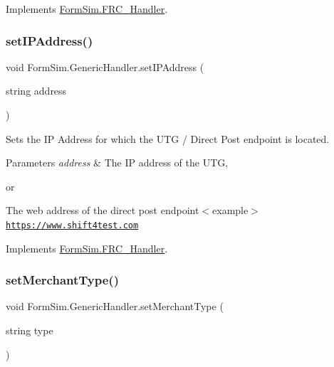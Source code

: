 Implements \mbox{\hyperlink{interface_form_sim_1_1_f_r_c___handler_a3c77b2e99c98553928e463a9cbb5f7d4}{Form\+Sim.\+F\+R\+C\+\_\+\+Handler}}.

\mbox{\label{class_form_sim_1_1_generic_handler_a7fa7f097410ae531b30fc6f257bcb393}} 
\subsubsection{\texorpdfstring{set\+I\+P\+Address()}{setIPAddress()}}
{\footnotesize\ttfamily void Form\+Sim.\+Generic\+Handler.\+set\+I\+P\+Address (\begin{DoxyParamCaption}\item[{string}]{address }\end{DoxyParamCaption})\hspace{0.3cm}{\ttfamily [inline]}}



Sets the IP Address for which the U\+TG / Direct Post endpoint is located. 


\begin{DoxyParams}{Parameters}
{\em address} & The IP address of the U\+TG, \\
\hline
\end{DoxyParams}
or

The web address of the direct post endpoint$<$example$>$\href{https://www.shift4test.com}{\tt https\+://www.\+shift4test.\+com}

Implements \mbox{\hyperlink{interface_form_sim_1_1_f_r_c___handler_a702c2593fce6995a49f0fb509a2c7605}{Form\+Sim.\+F\+R\+C\+\_\+\+Handler}}.

\mbox{\label{class_form_sim_1_1_generic_handler_a0a3b84b949b002deecb5523cec3cae23}} 
\subsubsection{\texorpdfstring{set\+Merchant\+Type()}{setMerchantType()}}
{\footnotesize\ttfamily void Form\+Sim.\+Generic\+Handler.\+set\+Merchant\+Type (\begin{DoxyParamCaption}\item[{string}]{type }\end{DoxyParamCaption})\hspace{0.3cm}{\ttfamily [inline]}}




